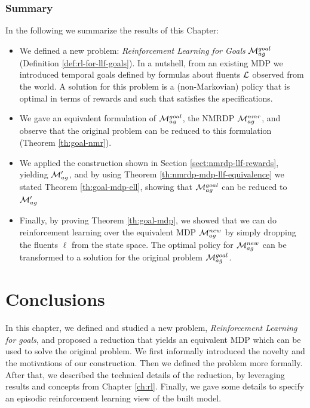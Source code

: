 \subsubsection{Summary}
In the following we summarize the results of this Chapter:
\begin{itemize}
	\item We defined a new problem: \emph{Reinforcement Learning for \LLf Goals} $\mathcal{M}_{ag}^{goal}$ (Definition \ref{def:rl-for-llf-goals}). In a nutshell, from an existing MDP we introduced temporal goals defined by \LLf formulas about fluents $\mathcal{L}$ observed from the world. A solution for this problem is a (non-Markovian) policy that is optimal in terms of rewards and such that satisfies the \LLf specifications.
	\item We gave an equivalent formulation of $\mathcal{M}_{ag}^{goal}$, the NMRDP $\mathcal{M}_{ag}^{nmr}$, and observe that the original problem can be reduced to this formulation (Theorem \ref{th:goal-nmr}).
	\item We applied the construction shown in Section \ref{sect:nmrdp-llf-rewards}, yielding $\mathcal{M}'_{ag}$, and by using Theorem \ref{th:nmrdp-mdp-llf-equivalence} we stated Theorem \ref{th:goal-mdp-ell}, showing that $\mathcal{M}_{ag}^{goal}$ can be reduced to $\mathcal{M}'_{ag}$
	\item Finally, by proving Theorem \ref{th:goal-mdp}, we showed that we can do reinforcement learning over the equivalent MDP $\mathcal{M}_{ag}^{new}$ by simply dropping the fluents $\ell$ from the state space. The optimal policy for $\mathcal{M}_{ag}^{new}$ can be transformed to a solution for the original problem $\mathcal{M}_{ag}^{goal}$.
\end{itemize}

\section{Conclusions}
In this chapter, we defined and studied a new problem, \emph{Reinforcement Learning for \LLf goals}, and proposed a reduction that yields an equivalent MDP which can be used to solve the original problem. We first informally introduced the novelty and the motivations of our construction. Then we defined the problem more formally. After that, we described the technical details of the reduction, by leveraging results and concepts from Chapter \ref{ch:rl}. Finally, we gave some details to specify an episodic reinforcement learning view of the built model. 

